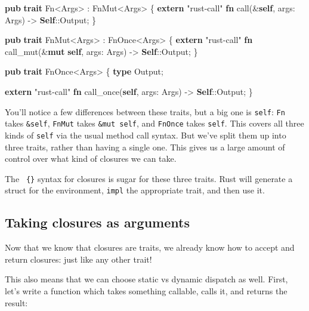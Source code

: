 \documentclass[a4paper,]{book}
\newenvironment{Shaded}{\begin{snugshade}}{\end{snugshade}}
\newcommand{\KeywordTok}[1]{\textcolor[rgb]{0.13,0.29,0.53}{\textbf{{#1}}}}
\newcommand{\StringTok}[1]{\textcolor[rgb]{0.31,0.60,0.02}{{#1}}}
\newcommand{\BuiltInTok}[1]{{#1}}
\newcommand{\NormalTok}[1]{{#1}}
\begin{document}
\begin{Shaded}
\begin{Highlighting}[]
\KeywordTok{pub} \KeywordTok{trait} \BuiltInTok{Fn}\NormalTok{<Args> : }\BuiltInTok{FnMut}\NormalTok{<Args> \{}
    \KeywordTok{extern} \StringTok{"rust-call"} \KeywordTok{fn} \NormalTok{call(&}\KeywordTok{self}\NormalTok{, args: Args) -> }\KeywordTok{Self}\NormalTok{::Output;}
\NormalTok{\}}

\KeywordTok{pub} \KeywordTok{trait} \BuiltInTok{FnMut}\NormalTok{<Args> : }\BuiltInTok{FnOnce}\NormalTok{<Args> \{}
    \KeywordTok{extern} \StringTok{"rust-call"} \KeywordTok{fn} \NormalTok{call_mut(&}\KeywordTok{mut} \KeywordTok{self}\NormalTok{, args: Args) -> }\KeywordTok{Self}\NormalTok{::Output;}
\NormalTok{\}}

\KeywordTok{pub} \KeywordTok{trait} \BuiltInTok{FnOnce}\NormalTok{<Args> \{}
    \KeywordTok{type} \NormalTok{Output;}

    \KeywordTok{extern} \StringTok{"rust-call"} \KeywordTok{fn} \NormalTok{call_once(}\KeywordTok{self}\NormalTok{, args: Args) -> }\KeywordTok{Self}\NormalTok{::Output;}
\NormalTok{\}}
\end{Highlighting}
\end{Shaded}

You'll notice a few differences between these traits, but a big one is
\texttt{self}: \texttt{Fn} takes \texttt{\&self}, \texttt{FnMut} takes
\texttt{\&mut\ self}, and \texttt{FnOnce} takes \texttt{self}. This
covers all three kinds of \texttt{self} via the usual method call
syntax. But we've split them up into three traits, rather than having a
single one. This gives us a large amount of control over what kind of
closures we can take.

The \texttt{\textbar{}\textbar{}\ \{\}} syntax for closures is sugar for
these three traits. Rust will generate a struct for the environment,
\texttt{impl} the appropriate trait, and then use it.

\subsection{Taking closures as
arguments}\label{taking-closures-as-arguments}

Now that we know that closures are traits, we already know how to accept
and return closures: just like any other trait!

This also means that we can choose static vs dynamic dispatch as well.
First, let's write a function which takes something callable, calls it,
and returns the result:
\end{document}
